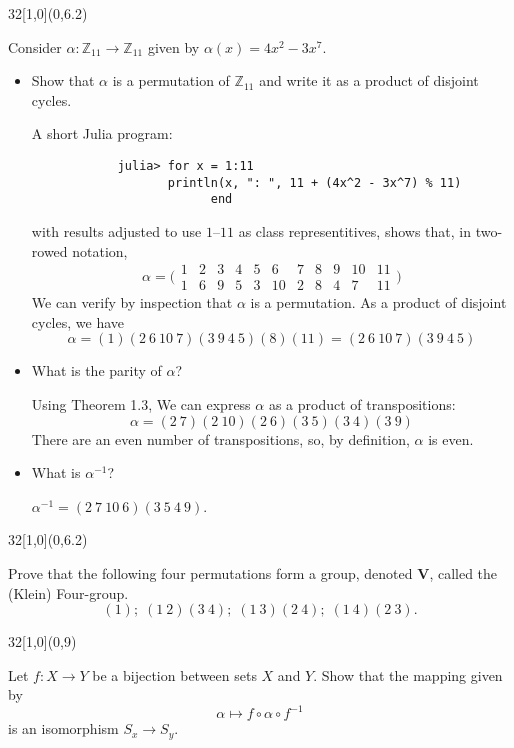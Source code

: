\documentclass[12pt]{article}
\newcommand{\zee}{\mathbb{Z}}
\newenvironment{exercise}[2]{\begin{textblock}{32}[1,0](0,#2)\noindent#1\end{textblock}}{\vspace{1in}}
\begin{document}
\begin{exercise}{1.29}{6.2}
	{\noindent}Consider $\alpha: \zee_{11}\to \zee_{11}$ given by $\alpha(x)=4x^2-3x^7$.
	\begin{itemize}
		\item Show that $\alpha$ is a permutation of $\zee_{11}$ and write it as a product of disjoint cycles.
		\bigskip

		A short Julia program:
		\begin{verbatim}
			julia> for x = 1:11
			       println(x, ": ", 11 + (4x^2 - 3x^7) % 11)
						 end
		\end{verbatim}
		with results adjusted to use $1$--$11$ as class representitives, shows that, in two-rowed notation,
		\[
		\alpha = \bigl(\begin{smallmatrix}
		    1 &  2 &  3 &  4 &  5 &  6 &  7 &  8 &  9 & 10 & 11 \\
		    1 &  6 &  9 &  5 &  3 & 10 &  2 &  8 &  4 &  7 & 11
		  \end{smallmatrix}\bigr)
		\]
		We can verify by inspection that $\alpha$ is a permutation. As a product of disjoint cycles, we have
		\[ \alpha = (1)(2\ 6\ 10\ 7)(3\ 9\ 4\ 5)(8)(11) = (2\ 6\ 10\ 7)(3\ 9\ 4\ 5) \]

		\item What is the parity of $\alpha$?
		\bigskip

		Using Theorem 1.3, We can express $\alpha$ as a product of transpositions:
		\[ \alpha = (2\ 7)(2\ 10)(2\ 6)(3\ 5)(3\ 4)(3\ 9) \]
		There are an even number of transpositions, so, by definition, $\alpha$ is even.

		\item What is $\alpha^{-1}$?
		\bigskip

		$\alpha^{-1}=(2\ 7\ 10\ 6)(3\ 5\ 4\ 9)$.
	\end{itemize}
\end{exercise}


\begin{exercise}{1.36}{6.2}
	{\noindent}Prove that the following four permutations form a group, denoted $\mathbf{V}$, called the (Klein) Four-group.
	\[(1);\; (1\ 2)(3\ 4);\; (1\ 3)(2\ 4);\; (1\ 4)(2\ 3).\]
	\bigskip

\end{exercise}


\begin{exercise}{1.39}{9}
	{\noindent}Let $f : X\to Y$ be a bijection between sets $X$ and $Y$. Show that the mapping given by \[\alpha \mapsto f\circ\alpha\circ f^{-1}\] is an isomorphism $S_x\to S_y$.
	\bigskip

\end{exercise}
\end{document}

